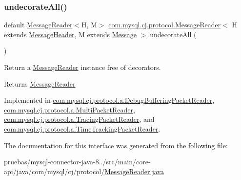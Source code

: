 \mbox{\label{interfacecom_1_1mysql_1_1cj_1_1protocol_1_1_message_reader_a22a326215a91e4d7bff08d1f2c3e1b6d}} 
\subsubsection{\texorpdfstring{undecorate\+All()}{undecorateAll()}}
{\footnotesize\ttfamily default \mbox{\hyperlink{interfacecom_1_1mysql_1_1cj_1_1protocol_1_1_message_reader}{Message\+Reader}}$<$H, M$>$ \mbox{\hyperlink{interfacecom_1_1mysql_1_1cj_1_1protocol_1_1_message_reader}{com.\+mysql.\+cj.\+protocol.\+Message\+Reader}}$<$ H extends \mbox{\hyperlink{interfacecom_1_1mysql_1_1cj_1_1protocol_1_1_message_header}{Message\+Header}}, M extends \mbox{\hyperlink{interfacecom_1_1mysql_1_1cj_1_1protocol_1_1_message}{Message}} $>$.undecorate\+All (\begin{DoxyParamCaption}{ }\end{DoxyParamCaption})}

Return a \mbox{\hyperlink{interfacecom_1_1mysql_1_1cj_1_1protocol_1_1_message_reader}{Message\+Reader}} instance free of decorators.

\begin{DoxyReturn}{Returns}
\mbox{\hyperlink{interfacecom_1_1mysql_1_1cj_1_1protocol_1_1_message_reader}{Message\+Reader}} 
\end{DoxyReturn}


Implemented in \mbox{\hyperlink{classcom_1_1mysql_1_1cj_1_1protocol_1_1a_1_1_debug_buffering_packet_reader_ae6337b7785d1c8adb1b4784387c2f959}{com.\+mysql.\+cj.\+protocol.\+a.\+Debug\+Buffering\+Packet\+Reader}}, \mbox{\hyperlink{classcom_1_1mysql_1_1cj_1_1protocol_1_1a_1_1_multi_packet_reader_a2a1c000ea384788f1ef5d8add224d309}{com.\+mysql.\+cj.\+protocol.\+a.\+Multi\+Packet\+Reader}}, \mbox{\hyperlink{classcom_1_1mysql_1_1cj_1_1protocol_1_1a_1_1_tracing_packet_reader_a92981daf5c4331ba841e31d90d6b43ed}{com.\+mysql.\+cj.\+protocol.\+a.\+Tracing\+Packet\+Reader}}, and \mbox{\hyperlink{classcom_1_1mysql_1_1cj_1_1protocol_1_1a_1_1_time_tracking_packet_reader_ab320fc6184aad94ebdba7260b574421f}{com.\+mysql.\+cj.\+protocol.\+a.\+Time\+Tracking\+Packet\+Reader}}.



The documentation for this interface was generated from the following file\+:\begin{DoxyCompactItemize}
\item 
pruebas/mysql-\/connector-\/java-\/8../src/main/core-\/api/java/com/mysql/cj/protocol/\mbox{\hyperlink{_message_reader_8java}{Message\+Reader.\+java}}\end{DoxyCompactItemize}

